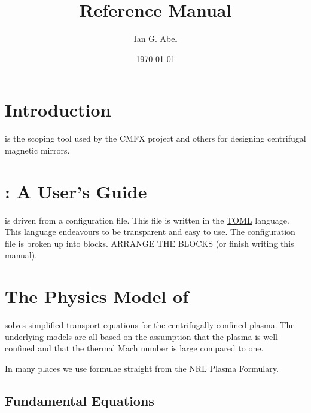\documentclass{revtex4-2}
\begin{document}
\date{\today}

\title{\mctrans{} Reference Manual}
\author{Ian G. Abel}


\maketitle
\section{Introduction}

\mctrans{} is the scoping tool used by the CMFX project and others for designing centrifugal magnetic mirrors.

\section{\mctrans{}: A User's Guide}

\mctrans{} is driven from a configuration file. This file is written in the \href{https://github.com/toml-lang/toml}{TOML} language. This language endeavours
to be transparent and easy to use. The configuration file is broken up into blocks. ARRANGE THE BLOCKS (or finish writing this manual).

\section{The Physics Model of \mctrans{}}

\mctrans{} solves simplified transport equations for the centrifugally-confined plasma. The underlying models are all based on the assumption that the plasma is well-confined and that the thermal Mach number is large compared to one.

In many places we use formulae straight from the NRL Plasma Formulary. 

\subsection{Fundamental Equations}
\end{document}
